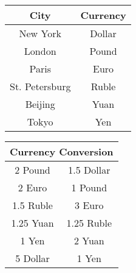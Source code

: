 \documentclass[12pt]{article}
\begin{document}
\begin{enumerate}
	\begin{tabular}{ | c | c | }
	\hline
	\bf{City} & \bf{Currency} \\ \hline \hline
	New York & Dollar \\ \hline
	London & Pound \\ \hline
	Paris & Euro \\ \hline
	St. Petersburg & Ruble \\ \hline
	Beijing & Yuan \\ \hline
	Tokyo & Yen \\ \hline
	\hline
	\end{tabular}

	\begin{tabular}{ | c | c | }
	\hline
	\multicolumn{2}{|c|}{\bf{Currency Conversion}} \\ \hline \hline
	2 Pound & 1.5 Dollar \\ \hline
	2 Euro & 1 Pound \\ \hline
	1.5 Ruble & 3 Euro \\ \hline
	1.25 Yuan & 1.25 Ruble \\ \hline
	1 Yen & 2 Yuan \\ \hline
	5 Dollar & 1 Yen \\ \hline
	\hline
	\end{tabular}

\end{enumerate}
\end{document}
